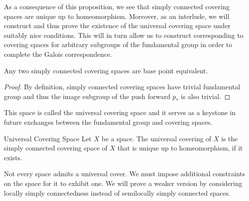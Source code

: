 \documentclass[a4paper]{article}
\begin{document}
As a consequence of this proposition, we see that simply connected covering spaces are unique up to homeomorphism. Moreover, as an interlude, we will construct and thus prove the existence of the universal covering space under suitably nice conditions. This will in turn allow us to construct corresponding to covering spaces for arbitrary subgroups of the fundamental group in order to complete the Galois correspondence. 

\begin{crl}{}{} Any two simply connected covering spaces are base point equivalent. \tcbline
\begin{proof}
By definition, simply connected covering spaces have trivial fundamental group and thus the image subgroup of the push forward $p_\ast$ is also trivial. 
\end{proof}
\end{crl}

This space is called the universal covering space and it serves as a keystone in future exchanges between the fundamental group and covering spaces. 

\begin{defn}{Universal Covering Space}{} Let $X$ be a space. The universal covering of $X$ is the simply connected covering space of $X$ that is unique up to homeomorphism, if it exists. 
\end{defn}

Not every space admits a universal cover. We must impose additional constraints on the space for it to exhibit one. We will prove a weaker version by considering locally simply connectedness instead of semilocally simply connected spaces. 
\end{document}
